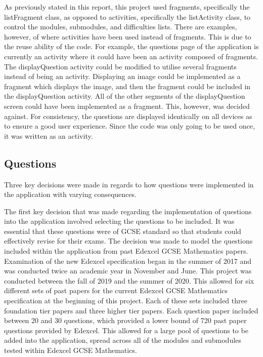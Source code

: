 \documentclass{article}
\begin{document}
As previously stated in this report, this project used fragments, specifically the listFragment class, as opposed to activities, specifically the listActivity class, to control the modules, submodules, and difficulties lists. There are examples, however, of where activities have been used instead of fragments. This is due to the reuse ability of the code. For example, the questions page of the application is currently an activity where it could have been an activity composed of fragments. The displayQuestion activity could be modified to utilise several fragments instead of being an activity. Displaying an image could be implemented as a fragment which displays the image, and then the fragment could be included in the displayQuestion activity. All of the other segments of the displayQuestion screen could have been implemented as a fragment. This, however, was decided against. For consistency, the questions are displayed identically on all devices as to ensure a good user experience. Since the code was only going to be used once, it was written as an activity. \par

\subsection{Questions}

Three key decisions were made in regards to how questions were implemented in the application with varying consequences. \par

The first key decision that was made regarding the implementation of questions into the application involved selecting the questions to be included. It was essential that these questions were of GCSE standard so that students could effectively revise for their exams. The decision was made to model the questions included within the application from past Edexcel GCSE Mathematics papers. Examination of the new Edexcel specification began in the summer of 2017 and was conducted twice an academic year in November and June. This project was conducted between the fall of 2019 and the summer of 2020. This allowed for six different sets of past papers for the current Edexcel GCSE Mathematics specification at the beginning of this project. Each of these sets included three foundation tier papers and three higher tier papers. Each question paper included between 20 and 30 questions, which provided a lower bound of 720 past paper questions provided by Edexcel. This allowed for a large pool of questions to be added into the application, spread across all of the modules and submodules tested within Edexcel GCSE Mathematics. \par
\end{document}
